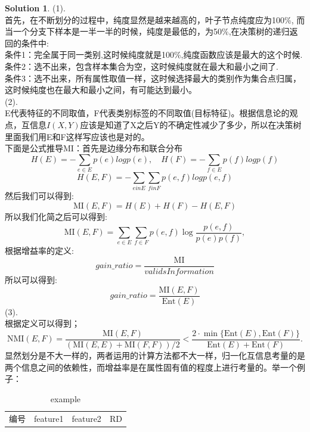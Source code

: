 \documentclass[a4paper]{article}
\numberwithin{equation}{section}
\theoremstyle{definition}
\newtheorem*{solution}{Solution}
\newcommand\sbr[1]{\left( #1 \right)}
\begin{document}
\begin{solution}
	(1).\\
    首先，在不断划分的过程中，纯度显然是越来越高的，叶子节点纯度应为100\%, 而当一个分支下样本是一半一半的时候，纯度是最低的，为50\%,在决策树的递归返回的条件中:\\
    条件1：完全属于同一类别,这时候纯度就是100\%,纯度函数应该是最大的这个时候.\\
    条件2：选不出来，包含样本集合为空，这时候纯度就在最大和最小之间了.\\
    条件3：选不出来，所有属性取值一样，这时候选择最大的类别作为集合点归属，这时候纯度也在最大和最小之间，有可能达到最小。\\
    (2).\\
    E代表特征的不同取值，F代表类别标签的不同取值(目标特征)。根据信息论的观点，互信息$I(X,Y)$应该是知道了X之后Y的不确定性减少了多少，所以在决策树里面我们用E和F这样写应该也是对的。\\
    下面是公式推导MI：首先是边缘分布和联合分布\\
    \[
        H(E) = -\sum_{e \in E}p(e)log p(e), \quad H(F) = -\sum_{f \in E}p(f)log p(f)
    \]
    \[
        H(E, F) = - \sum_{e in E} \sum_{f in F} p(e,f) log p(e,f)
    \]
    然后我们可以得到:\\
    \[
        \mathrm{MI}(E,F) = H(E) +H(F) - H(E,F)  
    \]
    所以我们化简之后可以得到:\\
    $$\mathrm{MI}(E,F) = \sum_{e \in E} \sum_{f \in F} p(e,f) \log \frac{p(e,f)}{p(e)p(f)},$$
    根据增益率的定义:\\
    $$gain\_ratio = \frac{\mathrm{MI}}{valids Information}$$
    所以可以得到:\\
    $$gain\_ratio = \frac{\mathrm{MI}(E,F)}{\mathrm{Ent}(E)}$$
    (3).\\
    根据定义可以得到；\\
    $$\mathrm{NMI}(E,F) = \frac{\mathrm{MI}(E,F)}{\sbr{\mathrm{MI}(E,E) + \mathrm{MI}(F,F)} / 2} < \frac{2 \cdot \min\{\mathrm{Ent}(E), \mathrm{Ent}(F)\} }{\mathrm{Ent}(E) + \mathrm{Ent}(F)}.$$
    显然划分是不大一样的，两者运用的计算方法都不大一样，归一化互信息考量的是两个信息之间的依赖性，而增益率是在属性固有值的程度上进行考量的。举一个例子：
    \begin{table}[ht]
        \centering
        \setlength{\abovecaptionskip}{0pt}
        \setlength{\belowcaptionskip}{5pt}
        \caption{example}
        \label{example}
        \begin{tabular}{ccc|c}
            \hline
            编号 & feature1 & feature2  & RD \\

\end{tabular}
\end{table}
\end{solution}
\end{document}
